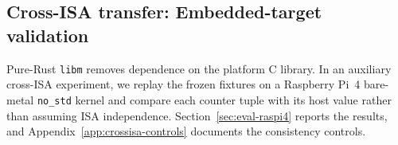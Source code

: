 \subsection{Cross-ISA transfer: Embedded-target validation}
\label{sec:meth-crossisa}
Pure-Rust \texttt{libm} removes dependence on the platform C library. In an auxiliary
cross-ISA experiment, we replay the frozen fixtures on a Raspberry Pi~4 bare-metal
\texttt{no\_std} kernel and compare each counter
tuple with its host value rather than assuming ISA independence. Section~\ref{sec:eval-raspi4}
reports the results, and Appendix~\ref{app:crossisa-controls} documents the consistency controls.
